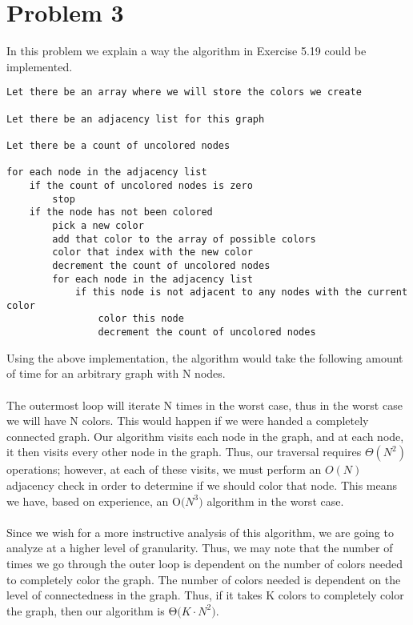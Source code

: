 \section*{Problem 3}

In this problem we explain a way the algorithm in Exercise 5.19 could be implemented.

\begin{lstlisting}
Let there be an array where we will store the colors we create

Let there be an adjacency list for this graph

Let there be a count of uncolored nodes

for each node in the adjacency list
    if the count of uncolored nodes is zero
        stop
    if the node has not been colored
        pick a new color
        add that color to the array of possible colors
        color that index with the new color
        decrement the count of uncolored nodes
        for each node in the adjacency list
            if this node is not adjacent to any nodes with the current color 
                color this node
                decrement the count of uncolored nodes
\end{lstlisting}

Using the above implementation, the algorithm would take the following amount of time for an arbitrary graph with N nodes.
\\
\\
The outermost loop will iterate N times in the worst case, thus in the worst case we will have N colors. This would happen if we were handed a completely connected graph. Our algorithm visits each node in the graph, and at each node, it then visits every other node in the graph. Thus, our traversal requires $\Theta(N^2)$ operations; however, at each of these visits, we must perform an $O(N)$ adjacency check in order to determine if we should color that node. This means we have, based on experience, an $\mathrm{O(}N^3 \mathrm{)}$ algorithm in the worst case. 
\\
\\
Since we wish for a more instructive analysis of this algorithm, we are going to analyze at a higher level of granularity. Thus, we may note that the number of times we go through the outer loop is dependent on the number of colors needed to completely color the graph. The number of colors needed is dependent on the level of connectedness in the graph. Thus, if it takes K colors to completely color the graph, then our algorithm is  $\mathrm{\Theta (}K \cdot N^2 \mathrm{)}$. 